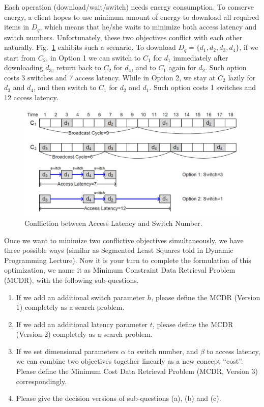 \documentclass[12pt,a4paper]{article}
\theoremstyle{definition}
\begin{document}
\begin{enumerate}
		Each operation (download/wait/switch) needs energy consumption. To conserve energy, a client hopes to use minimum amount of energy to download all required items in $D_q$, which means that he/she waits to minimize both access latency and switch numbers. Unfortunately, these two objectives conflict with each other naturally. Fig.~\ref{Fig-Conflict} exhibits such a scenario. To download $D_q=\{d_1, d_2, d_3, d_4\}$, if we start from $C_2$, in Option 1 we can switch to $C_1$ for $d_1$ immediately after downloading $d_3$, return back to $C_2$ for $d_4$, and to $C_1$ again for $d_2$. Such option costs 3 switches and 7 access latency. While in Option 2, we stay at $C_2$ lazily for $d_3$ and $d_4$, and then switch to $C_1$ for $d_2$ and $d_1$. Such option costs 1 switches and 12 access latency.
		
		
		\begin{figure}[!htbp]
			\centering
			\includegraphics[scale= 0.5]{Fig-Conflict.pdf}
			\caption{Confliction between Access Latency and Switch Number.} \label{Fig-Conflict}
		\end{figure}
		
		Once we want to minimize two conflictive objectives simultaneously, we have three possible ways (similar as Segmented Least Squares told in Dynamic Programming Lecture). Now it is your turn to complete the formulation of this optimization, we name it as Minimum Constraint Data Retrieval Problem (MCDR), with the following sub-questions.
		\begin{enumerate}
			\item If we add an additional switch parameter $h$, please define the MCDR (Version 1) completely as a search problem.
			\item If we add an additional latency parameter $t$, please define the MCDR (Version 2) completely as a search problem.
			\item If we set dimensional parameters $\alpha$ to switch number, and $\beta$ to access latency, we can combine two objectives together linearly as a new concept ``cost''. Please define the Minimum Cost Data Retrieval Problem (MCDR, Version 3) correspondingly.
			\item Please give the decision versions of sub-questions (a), (b) and (c).
		\end{enumerate}
		

\end{enumerate}
\end{document}
